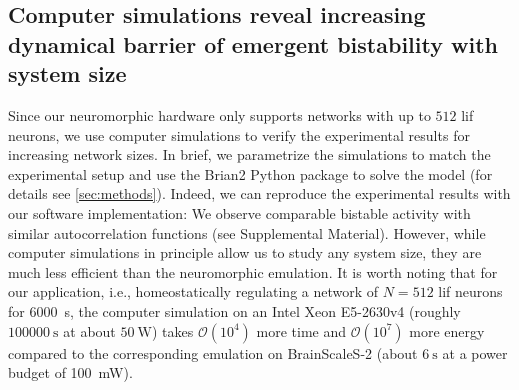 
\subsection{Computer simulations reveal increasing dynamical barrier of emergent bistability with system size}

Since our neuromorphic hardware only supports networks with up to $512$ \gls{lif} neurons, we use computer simulations to verify the experimental results for increasing network sizes.
In brief, we parametrize the simulations to match the experimental setup and use the Brian2 Python package to solve the model (for details see \cref{sec:methods}).
Indeed, we can reproduce the experimental results with our software implementation: We observe comparable bistable activity with similar autocorrelation functions (see Supplemental Material).
However, while computer simulations in principle allow us to study any system size, they are much less efficient than the neuromorphic emulation.
It is worth noting that for our application, i.e., homeostatically regulating a network of $N=512$ \gls{lif} neurons for \SI{6000}{\second}, the computer simulation on an Intel Xeon E5-2630v4 (roughly $\SI{100 000}{\second}$ at about $\SI{50}{\watt}$) takes $\mathcal{O}(10^4)$ more time and $\mathcal{O}(10^7)$ more energy compared to the corresponding emulation on BrainScaleS-2 (about $\SI{6}{\second}$ at a power budget of \SI{100}{\milli\watt}).


